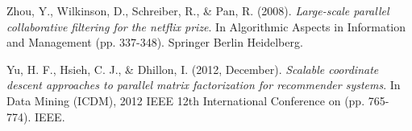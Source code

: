 \documentclass[10pt]{article}
\begin{document}
\begin{thebibliography}{9}
 Zhou, Y., Wilkinson, D., Schreiber, R., \& Pan, R. (2008). \emph{Large-scale parallel collaborative filtering for the netflix prize}. In Algorithmic Aspects in Information and Management (pp. 337-348). Springer Berlin Heidelberg.

Yu, H. F., Hsieh, C. J., \& Dhillon, I. (2012, December). \emph{Scalable coordinate descent approaches to parallel matrix factorization for recommender systems}. In Data Mining (ICDM), 2012 IEEE 12th International Conference on (pp. 765-774). IEEE.
\end{thebibliography}
\end{document}
